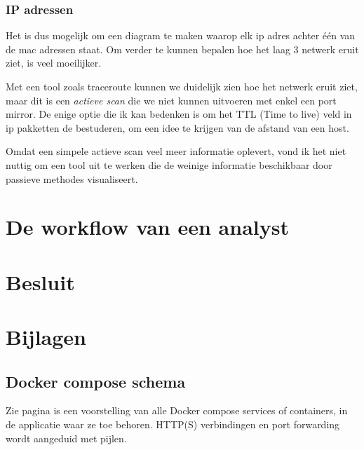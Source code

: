 \documentclass[a4paper,12pt]{report}
\begin{document}
\subsection{IP adressen}
Het is dus mogelijk om een diagram te maken waarop elk ip adres achter één van de mac adressen staat.
Om verder te kunnen bepalen hoe het laag 3 netwerk eruit ziet, is veel moeilijker.

Met een tool zoals traceroute kunnen we duidelijk zien hoe het netwerk eruit ziet, maar dit is een \emph{actieve scan} die we niet kunnen uitvoeren met enkel een port mirror.
De enige optie die ik kan bedenken is om het TTL (Time to live) veld in ip pakketten de bestuderen, om een idee te krijgen van de afstand van een host.

Omdat een simpele actieve scan veel meer informatie oplevert, vond ik het niet nuttig om een tool uit te werken die de weinige informatie beschikbaar door passieve methodes visualiseert.

\chapter{De workflow van een analyst}



\chapter*{Besluit}
\blindtext

\chapter*{Bijlagen}

\section{Docker compose schema}
Zie pagina \pageref{bijlage:aangepast-systeem-schema-docker} is een voorstelling van alle Docker compose services of containers, in de applicatie waar ze toe behoren.
HTTP(S) verbindingen en port forwarding wordt aangeduid met pijlen.



\printbibliography
{}

\newpage
\thispagestyle{empty}
\mbox{}

\newpage
\thispagestyle{empty}
\mbox{}
\end{document}
